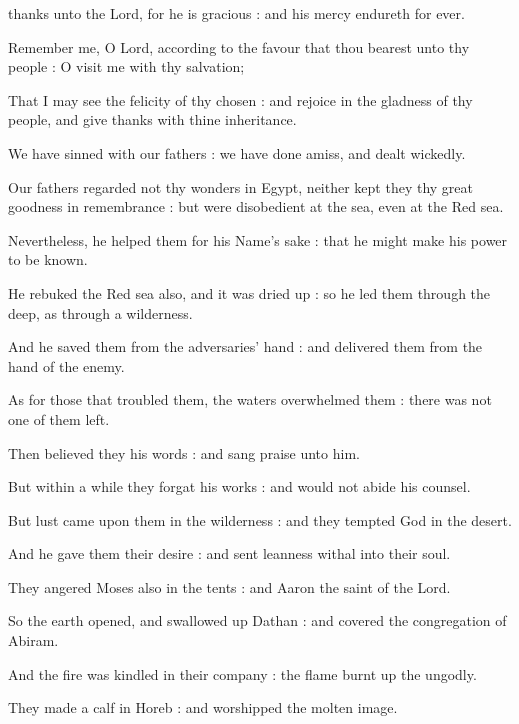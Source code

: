  thanks unto the Lord, for he is gracious : and his mercy endureth for ever.\par
{}
Remember me, O Lord, according to the favour that thou bearest unto thy people : O visit me with thy salvation;\par
{}That I may see the felicity of thy chosen : and rejoice in the gladness of thy people, and give thanks with thine inheritance.\par
{}We have sinned with our fathers : we have done amiss, and dealt wickedly.\par
{}Our fathers regarded not thy wonders in Egypt, neither kept they thy great goodness in remembrance : but were disobedient at the sea, even at the Red sea.\par
{}Nevertheless, he helped them for his Name's sake : that he might make his power to be known.\par
{}He rebuked the Red sea also, and it was dried up : so he led them through the deep, as through a wilderness.\par
{}And he saved them from the adversaries' hand : and delivered them from the hand of the enemy.\par
{}As for those that troubled them, the waters overwhelmed them : there was not one of them left.\par
{}Then believed they his words : and sang praise unto him.\par
{}But within a while they forgat his works : and would not abide his counsel.\par
{}But lust came upon them in the wilderness : and they tempted God in the desert.\par
{}And he gave them their desire : and sent leanness withal into their soul.\par
{}They angered Moses also in the tents : and Aaron the saint of the Lord.\par
{}So the earth opened, and swallowed up Dathan : and covered the congregation of Abiram.\par
{}And the fire was kindled in their company : the flame burnt up the ungodly.\par
{}They made a calf in Horeb : and worshipped the molten image.\par
